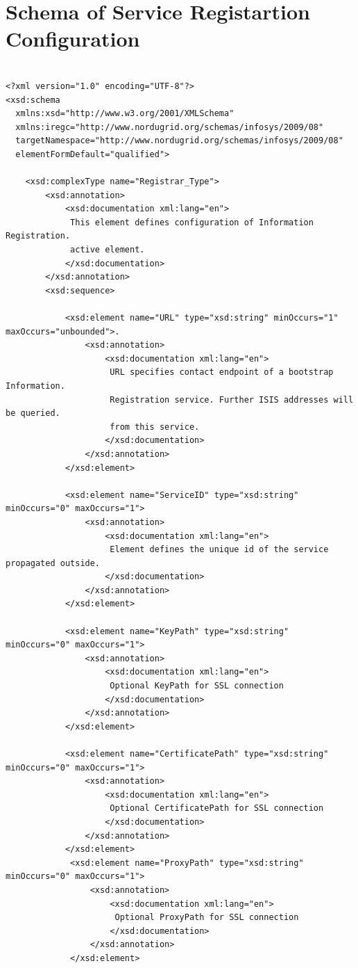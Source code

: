 \documentclass{book}
\begin{document}

\section{Schema of Service Registartion Configuration}
\label{annex:service_configuration_schema}
\begin{verbatim}

<?xml version="1.0" encoding="UTF-8"?>
<xsd:schema
  xmlns:xsd="http://www.w3.org/2001/XMLSchema"
  xmlns:iregc="http://www.nordugrid.org/schemas/infosys/2009/08"
  targetNamespace="http://www.nordugrid.org/schemas/infosys/2009/08"
  elementFormDefault="qualified">

    <xsd:complexType name="Registrar_Type">
        <xsd:annotation>
            <xsd:documentation xml:lang="en">
             This element defines configuration of Information Registration.
             active element.
            </xsd:documentation>
        </xsd:annotation>
        <xsd:sequence>

            <xsd:element name="URL" type="xsd:string" minOccurs="1" maxOccurs="unbounded">.
                <xsd:annotation>
                    <xsd:documentation xml:lang="en">
                     URL specifies contact endpoint of a bootstrap Information.
                     Registration service. Further ISIS addresses will be queried.
                     from this service.
                    </xsd:documentation>
                </xsd:annotation>
            </xsd:element>

            <xsd:element name="ServiceID" type="xsd:string" minOccurs="0" maxOccurs="1">
                <xsd:annotation>
                    <xsd:documentation xml:lang="en">
                     Element defines the unique id of the service propagated outside.
                    </xsd:documentation>
                </xsd:annotation>
            </xsd:element>

            <xsd:element name="KeyPath" type="xsd:string"  minOccurs="0" maxOccurs="1">
                <xsd:annotation>
                    <xsd:documentation xml:lang="en">
                     Optional KeyPath for SSL connection
                    </xsd:documentation>
                </xsd:annotation>
            </xsd:element>

            <xsd:element name="CertificatePath" type="xsd:string"  minOccurs="0" maxOccurs="1">
                <xsd:annotation>
                    <xsd:documentation xml:lang="en">
                     Optional CertificatePath for SSL connection
                    </xsd:documentation>
                </xsd:annotation>
            </xsd:element>
             <xsd:element name="ProxyPath" type="xsd:string"  minOccurs="0" maxOccurs="1">
                 <xsd:annotation>
                     <xsd:documentation xml:lang="en">
                      Optional ProxyPath for SSL connection
                     </xsd:documentation>
                 </xsd:annotation>
             </xsd:element>


\end{verbatim}
\end{document}
